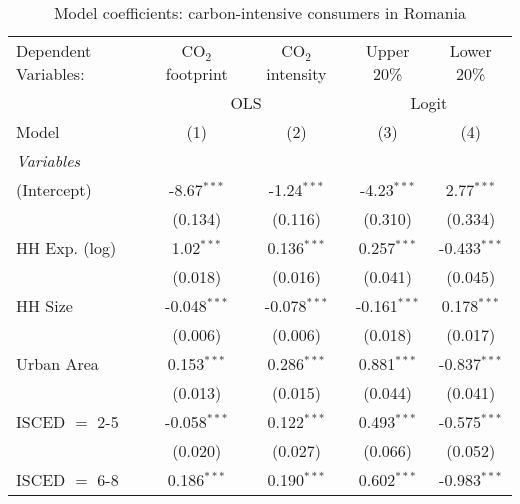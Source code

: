 
\begin{table}[htbp!]
   \centering
   \small
   \begin{adjustbox}{width = 1\textwidth, max height = 0.95\textheight, center}
      \begin{threeparttable}[b]
         \caption{\label{tab:Logit_1_ROU} Model coefficients: carbon-intensive consumers in Romania}
         \begin{tabular}{lcccc}
            \tabularnewline \midrule \midrule
            Dependent Variables: & CO$_{2}$ footprint & CO$_{2}$ intensity & Upper 20\%     & Lower 20\%\\   
             & \multicolumn{2}{c}{OLS} & \multicolumn{2}{c}{Logit} \\ 
            Model                & (1)                & (2)                & (3)            & (4)\\  
            \midrule
            \emph{Variables}\\
            (Intercept)          & -8.67$^{***}$      & -1.24$^{***}$      & -4.23$^{***}$  & 2.77$^{***}$\\   
                                 & (0.134)            & (0.116)            & (0.310)        & (0.334)\\   
            HH Exp. (log)        & 1.02$^{***}$       & 0.136$^{***}$      & 0.257$^{***}$  & -0.433$^{***}$\\   
                                 & (0.018)            & (0.016)            & (0.041)        & (0.045)\\   
            HH Size              & -0.048$^{***}$     & -0.078$^{***}$     & -0.161$^{***}$ & 0.178$^{***}$\\   
                                 & (0.006)            & (0.006)            & (0.018)        & (0.017)\\   
            Urban Area           & 0.153$^{***}$      & 0.286$^{***}$      & 0.881$^{***}$  & -0.837$^{***}$\\   
                                 & (0.013)            & (0.015)            & (0.044)        & (0.041)\\   
            ISCED $=$ 2-5        & -0.058$^{***}$     & 0.122$^{***}$      & 0.493$^{***}$  & -0.575$^{***}$\\   
                                 & (0.020)            & (0.027)            & (0.066)        & (0.052)\\   
            ISCED $=$ 6-8        & 0.186$^{***}$      & 0.190$^{***}$      & 0.602$^{***}$  & -0.983$^{***}$\\   

\end{tabular}
\end{threeparttable}
\end{adjustbox}
\end{table}
